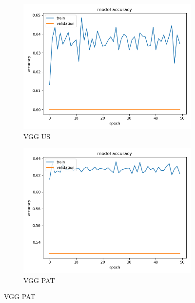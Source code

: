 \begin{figure}
\begin{subfigure}[b]{.45\linewidth}
\includegraphics[width=\linewidth]{Figs/vgg_us_acc.jpg}
\caption{VGG US}
\end{subfigure}
\begin{subfigure}[b]{.45\linewidth}
\includegraphics[width=\linewidth]{Figs/vgg_pat_acc.jpg}
\caption{VGG PAT}
\end{subfigure}


\end{figure}

